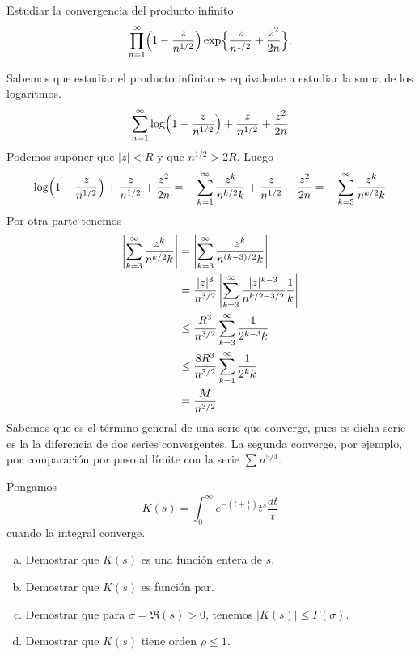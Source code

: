 \documentclass[twoside]{article}
\begin{document}
\newpage
\begin{ejercicio}{10}
Estudiar la convergencia del producto infinito
\[\prod_{n=1}^\infty \Bigl(1-\frac{z}{n^{1/2}}\Bigr)\exp\Bigl\{\frac{z}{n^{1/2}}+\frac{z^2}{2n}\Bigr\}.\]
\end{ejercicio}
\begin{solucion}
Sabemos que estudiar el producto infinito es equivalente a estudiar la suma de los logaritmos.
$$
\sum_{n=1}^\infty \log\Bigl(1-\frac{z}{n^{1/2}}\Bigr) + \frac{z}{n^{1/2}}+\frac{z^2}{2n}
$$
Podemos suponer que $|z|<R$ y que $n^{1/2}>2R$. Luego
$$
\log\Bigl(1-\frac{z}{n^{1/2}}\Bigr) + \frac{z}{n^{1/2}}+\frac{z^2}{2n} = -\sum_{k=1}^\infty \frac{z^k}{n^{k/2}k} + \frac{z}{n^{1/2}}+\frac{z^2}{2n} = -\sum_{k=3}^\infty \frac{z^k}{n^{k/2}k}
$$
Por otra parte tenemos
\begin{align*}
\left\lvert\sum_{k=3}^\infty \frac{z^k}{n^{k/2}k}\right\rvert &= \left\lvert\sum_{k=3}^\infty \frac{z^k}{n^{(k-3)/2}k}\right\rvert\\
& = \frac{|z|^3}{n^{3/2}}\left\lvert\sum_{k=3}^\infty \frac{|z|^{k-3}}{n^{k/2-3/2}}\frac{1}{k}\right\rvert\\
& \leq  \frac{R^{3}}{n^{3/2}}\sum_{k=3}^\infty \frac{1}{2^{k-3}k}\\
& \leq  \frac{8R^{3}}{n^{3/2}}\sum_{k=1}^\infty \frac{1}{2^{k}k}\\
&= \frac{M}{n^{3/2}}
\end{align*}
Sabemos que es el término general de una serie que converge, pues es dicha serie es la la diferencia de dos series convergentes. La segunda converge, por ejemplo, por comparación por paso al límite con la serie $\sum n^{5/4}$.
\end{solucion}
\newpage
\begin{ejercicio}{11}
Pongamos
$$K(s)=\int_0^\infty e^{-(t+\frac{1}{t})}t^s\frac{dt}{t}$$
cuando la integral converge. 
\begin{enumerate}[a)]
\item Demostrar que $K(s)$ es una función entera de $s$.
\item Demostrar que $K(s)$ es función par.
\item Demostrar que para $\sigma=\Re(s)>0$, tenemos
$|K(s)|\le \Gamma(\sigma)$.
\item Demostrar que $K(s)$ tiene orden $\rho\le1$.
\end{enumerate}
\end{ejercicio}
\end{document}
